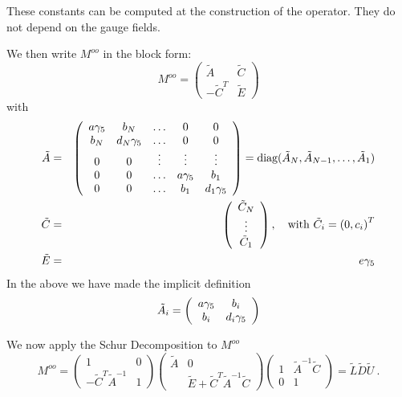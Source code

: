 \documentclass[12pt]{article}
\begin{document}
These constants can be computed at the construction of the operator. 
They do not depend on the gauge fields.

We then write $M^{oo}$ in the block form:
\begin{equation}
M^{oo} = \left( \begin{array}{cc} 
  \tilde{A} & \tilde{C} \\
  -\tilde{C}^{T} & \tilde{E} 
\end{array}\right)
\end{equation}
with
\begin{eqnarray}
\tilde{A} &=& \left( \begin{array}{ccccc}
 a \gamma_5 & b_N & \ldots & 0 & 0 \\
 b_N & d_N \gamma_5 & \ldots & 0 & 0 \\
 0   &  0  & \vdots & \vdots & \vdots \\
 0   &  0 & \ldots & a \gamma_5 & b_1  \\
 0   &  0 & \ldots & b_1   & d_1 \gamma_5 
\end{array} \right) = \mbox{diag}(\tilde{A}_N, \tilde{A}_{N-1},\ldots, \tilde{A}_1) \\
\tilde{C} &=& \left( \begin{array}{c} 
\tilde{C}_N \\
\vdots \\
\tilde{C}_1
\end{array} \right), \quad \mbox{with} \ \tilde{C}_i = \left(0,c_i\right)^T \\
\tilde{E} &=& e\gamma_5
\end{eqnarray}
In the above we have made the implicit definition
\begin{equation}
\tilde{A}_i 
= \left( \begin{array}{cc} a\gamma_5 & b_i \\ b_i & d_i \gamma_5 \end{array} \right)
\end{equation}

We now apply the Schur Decomposition to $M^{oo}$
\begin{equation}
M^{oo} = \left( \begin{array}{cc} 
1 & 0 \\
-\tilde{C}^T \tilde{A}^{-1} & 1 
\end{array} \right)
\left( \begin{array}{cc} 
 \tilde{A} & 0 \\
           & \tilde{E} + \tilde{C}^{T}\tilde{A}^{-1}\tilde{C} 
\end{array} \right)
\left(\begin{array}{cc}
1 & \tilde{A}^{-1} \tilde{C} \\ 
0 &  1 
\end{array}\right) = \tilde{L} \tilde{D} \tilde{U} \ .
\end{equation}
\end{document}

